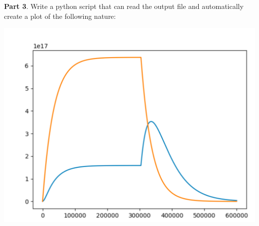\documentclass[10pt,letterpaper,notitlepage]{article}
\begin{document}
\textbf{Part 3}. Write a python script that can read the output file and automatically create a plot of the following nature:
\begin{center}
	\includegraphics[width=0.4\linewidth]{screenshot001.png}
\end{center}


 
%	
%	   

\end{document}
